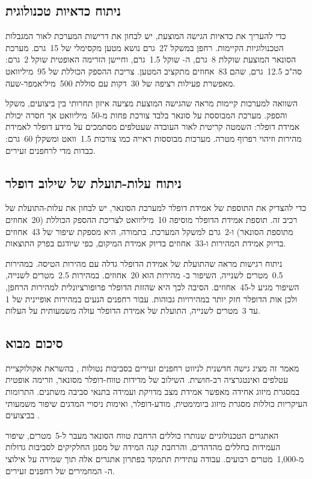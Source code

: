 \subsection{ניתוח כדאיות טכנולוגית}
\label{sec:feasibility}

כדי להעריך את כדאיות הגישה המוצעת, יש לבחון את דרישות המערכת לאור המגבלות הטכנולוגיות הקיימות. רחפן  במשקל 27~גרם נושא מטען מקסימלי של 15~גרם. מערכת הסונאר המוצעת שוקלת 8~גרם,  ה- שוקל 1.5~גרם, וחיישן הזרימה האופטית שוקל 2~גרם: סה"כ 12.5~גרם, שהם 83~אחוזים מתקציב המטען. צריכת ההספק הכוללת של 95~מיליוואט מאפשרת פעילות רציפה של 30~דקות עם סוללת 500~מיליאמפר-שעה.

השוואה למערכות קיימות מראה שהגישה המוצעת מציעה איזון תחרותי בין ביצועים, משקל והספק. מערכת  המבוססת על סונאר בלבד צורכת פחות מ-50~מיליוואט אך חסרה יכולת אמידת דופלר: השמטה קריטית לאור העובדה שעטלפים מסתמכים על מידע דופלר לאמידת מהירות וזיהוי רפרוף מטרה. מערכות מבוססות ראייה כמו  צורכות 1.5~וואט ומשקלן 60~גרם: כבדות מדי לרחפנים זעירים.

\subsection{ניתוח עלות-תועלת של שילוב דופלר}
\label{sec:cost_benefit}

כדי להצדיק את התוספת של אמידת דופלר למערכת הסונאר, יש לבחון את עלות-התועלת של רכיב זה. תוספת אמידת הדופלר מוסיפה 10~מיליוואט לצריכת ההספק הכוללת (20~אחוזים מתוספת הסונאר) ו-2~גרם למשקל המערכת. בתמורה, היא מספקת שיפור של 43~אחוזים בדיוק אמידת המהירות ו-33~אחוזים בדיוק אמידת המיקום, כפי שיודגם בפרק התוצאות.

ניתוח רגישות מראה שהתועלת של אמידת הדופלר גדלה עם מהירות הטיסה. במהירות 0.5~מטרים לשנייה, השיפור ב- מהירות הוא 20~אחוזים. במהירות 2.5~מטרים לשנייה, השיפור מגיע ל-45~אחוזים. הסיבה לכך היא שהזזת הדופלר פרופורציונלית למהירות הרחפן, ולכן אות הדופלר חזק יותר במהירויות גבוהות. עבור רחפנים הנעים במהירות אופיינית של 1 עד 3~מטרים לשנייה, התועלת של אמידת הדופלר עולה משמעותית על העלות.

\subsection{סיכום מבוא}
\label{sec:intro_summary}

מאמר זה מציג גישה חדשנית לניווט רחפנים זעירים בסביבות נטולות , בהשראת אקולוקציית עטלפים ואינטגרציה רב-חושית. השילוב של מדידות טווח-דופלר מסונאר,  וזרימה אופטית במסגרת מיזוג אחידה מאפשר אמידת מצב מדויקת ועמידה בתנאי סביבה משתנים. התרומות העיקריות כוללות מסגרת מיזוג ביומימטית,  מודע-דופלר, ואימות ניסויי המדגים שיפור משמעותי בביצועים \cite{GriffinBatEcholocation, MossEcholocation, Chen2020BioSonar, Thrun2005ProbRobotics}.

האתגרים הטכנולוגיים שנותרו כוללים הרחבת טווח הסונאר מעבר ל-5~מטרים, שיפור העמידות בחללים מהדהדים, והרחבת קנה המידה של מסנן החלקיקים לסביבות גדולות מ-1,000~מטרים רבועים. עבודה עתידית תתמקד בפתרון אתגרים אלה תוך שמירה על אילוצי ה- המחמירים של רחפנים זעירים.